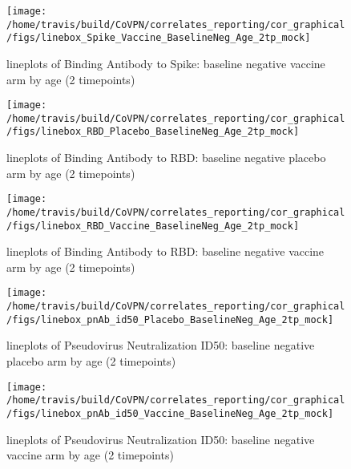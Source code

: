 \documentclass[]{book}
\theoremstyle{definition}
\theoremstyle{definition}
\theoremstyle{definition}
\newcommand{\1}{\mathbbm{1}}
\begin{document}
\clearpage
\begin{figure}[H]

{\centering \texttt{[image: /home/travis/build/CoVPN/correlates\_reporting/cor\_graphical/figs/linebox\_Spike\_Vaccine\_BaselineNeg\_Age\_2tp\_mock]} 

}

\caption{lineplots of Binding Antibody to Spike: baseline negative vaccine arm by age (2 timepoints)}\label{fig:unnamed-chunk-60}
\end{figure}

\clearpage
\begin{figure}[H]

{\centering \texttt{[image: /home/travis/build/CoVPN/correlates\_reporting/cor\_graphical/figs/linebox\_RBD\_Placebo\_BaselineNeg\_Age\_2tp\_mock]} 

}

\caption{lineplots of Binding Antibody to RBD: baseline negative placebo arm by age (2 timepoints)}\label{fig:unnamed-chunk-61}
\end{figure}

\clearpage
\begin{figure}[H]

{\centering \texttt{[image: /home/travis/build/CoVPN/correlates\_reporting/cor\_graphical/figs/linebox\_RBD\_Vaccine\_BaselineNeg\_Age\_2tp\_mock]} 

}

\caption{lineplots of Binding Antibody to RBD: baseline negative vaccine arm by age (2 timepoints)}\label{fig:unnamed-chunk-62}
\end{figure}

\clearpage
\begin{figure}[H]

{\centering \texttt{[image: /home/travis/build/CoVPN/correlates\_reporting/cor\_graphical/figs/linebox\_pnAb\_id50\_Placebo\_BaselineNeg\_Age\_2tp\_mock]} 

}

\caption{lineplots of Pseudovirus Neutralization ID50: baseline negative placebo arm by age (2 timepoints)}\label{fig:unnamed-chunk-63}
\end{figure}

\clearpage
\begin{figure}[H]

{\centering \texttt{[image: /home/travis/build/CoVPN/correlates\_reporting/cor\_graphical/figs/linebox\_pnAb\_id50\_Vaccine\_BaselineNeg\_Age\_2tp\_mock]} 

}

\caption{lineplots of Pseudovirus Neutralization ID50: baseline negative vaccine arm by age (2 timepoints)}\label{fig:unnamed-chunk-64}
\end{figure}
\end{document}
